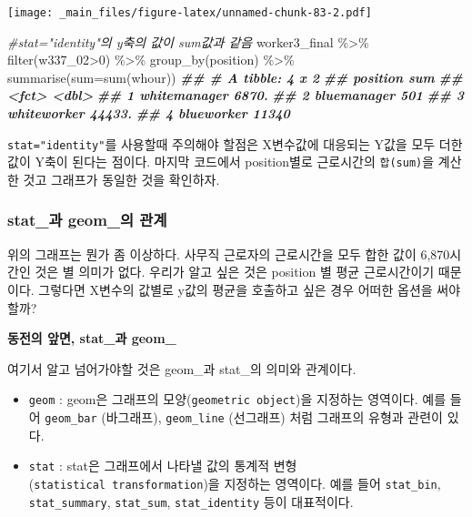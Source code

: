 \documentclass[
]{book}
\newenvironment{Shaded}{\begin{snugshade}}{\end{snugshade}}
\newcommand{\AttributeTok}[1]{\textcolor[rgb]{0.77,0.63,0.00}{#1}}
\newcommand{\CommentTok}[1]{\textcolor[rgb]{0.56,0.35,0.01}{\textit{#1}}}
\newcommand{\DecValTok}[1]{\textcolor[rgb]{0.00,0.00,0.81}{#1}}
\newcommand{\DocumentationTok}[1]{\textcolor[rgb]{0.56,0.35,0.01}{\textbf{\textit{#1}}}}
\newcommand{\FunctionTok}[1]{\textcolor[rgb]{0.00,0.00,0.00}{#1}}
\newcommand{\NormalTok}[1]{#1}
\newcommand{\SpecialCharTok}[1]{\textcolor[rgb]{0.00,0.00,0.00}{#1}}
\providecommand{\tightlist}{%
  \setlength{\itemsep}{0pt}\setlength{\parskip}{0pt}}
\theoremstyle{definition}
\theoremstyle{definition}
\theoremstyle{definition}
\theoremstyle{definition}
\theoremstyle{remark}
\begin{document}
\texttt{[image: \_main\_files/figure-latex/unnamed-chunk-83-2.pdf]}

\begin{Shaded}
\begin{Highlighting}[]

\CommentTok{\#stat="identity"의 y축의 값이 sum값과 같음}
\NormalTok{worker3\_final }\SpecialCharTok{\%\textgreater{}\%} 
  \FunctionTok{filter}\NormalTok{(w337\_02}\SpecialCharTok{\textgreater{}}\DecValTok{0}\NormalTok{) }\SpecialCharTok{\%\textgreater{}\%}
  \FunctionTok{group\_by}\NormalTok{(position) }\SpecialCharTok{\%\textgreater{}\%} 
  \FunctionTok{summarise}\NormalTok{(}\AttributeTok{sum=}\FunctionTok{sum}\NormalTok{(whour))}
\DocumentationTok{\#\# \# A tibble: 4 x 2}
\DocumentationTok{\#\#   position        sum}
\DocumentationTok{\#\#   \textless{}fct\textgreater{}         \textless{}dbl\textgreater{}}
\DocumentationTok{\#\# 1 whitemanager  6870.}
\DocumentationTok{\#\# 2 bluemanager    501 }
\DocumentationTok{\#\# 3 whiteworker  44433.}
\DocumentationTok{\#\# 4 blueworker   11340}
\end{Highlighting}
\end{Shaded}

\texttt{stat="identity"}를 사용할때 주의해야 할점은 X변수값에 대응되는 Y값을 모두 더한 값이 Y축이 된다는 점이다. 마지막 코드에서 position별로 근로시간의 \texttt{합(sum)}을 계산한 것고 그래프가 동일한 것을 확인하자.

\hypertarget{stat_uxacfc-geom_uxc758-uxad00uxacc4}{%
\subsubsection{stat\_과 geom\_의 관계}\label{stat_uxacfc-geom_uxc758-uxad00uxacc4}}

위의 그래프는 뭔가 좀 이상하다. 사무직 근로자의 근로시간을 모두 합한 값이 6,870시간인 것은 별 의미가 없다. 우리가 알고 싶은 것은 position 별 평균 근로시간이기 때문이다. 그렇다면 X변수의 값별로 y값의 평균을 호출하고 싶은 경우 어떠한 옵션을 써야 할까?

\textbf{동전의 앞면, stat\_과 geom\_}

여기서 알고 넘어가야할 것은 geom\_과 stat\_의 의미와 관계이다.

\begin{itemize}
\tightlist
\item
  \texttt{geom} : geom은 그래프의 모양(\texttt{geometric\ object})을 지정하는 영역이다. 예를 들어 \texttt{geom\_bar} (바그래프), \texttt{geom\_line} (선그래프) 처럼 그래프의 유형과 관련이 있다.
\item
  \texttt{stat} : stat은 그래프에서 나타낼 값의 통계적 변형(\texttt{statistical\ transformation})을 지정하는 영역이다. 예를 들어 \texttt{stat\_bin}, \texttt{stat\_summary}, \texttt{stat\_sum}, \texttt{stat\_identity} 등이 대표적이다.
\end{itemize}
\end{document}
